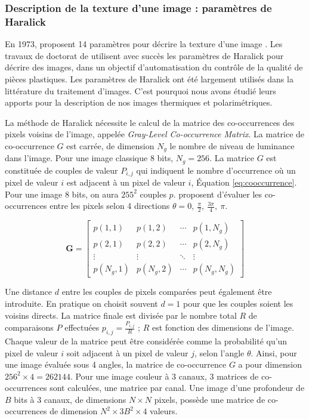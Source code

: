 \subsubsection{Description de la texture d'une image : paramètres de Haralick} \label{subsubsec:haralick}
En 1973, \citeauthor{haralick_textural_1973} proposent 14 paramètres pour décrire la texture d'une image \cite{haralick_textural_1973}.
Les travaux de doctorat de \citeauthor{lacombe_exploitation_2018a} utilisent avec succès les paramètres de Haralick pour décrire des images, dans un objectif  d'automatisation du contrôle de la qualité de pièces plastiques.
Les paramètres de Haralick ont été largement utilisés dans la littérature du traitement d'images.
C'est pourquoi nous avons étudié leurs apports pour la description de nos images thermiques et polarimétriques.

La méthode de Haralick nécessite le calcul de la matrice des co-occurrences des pixels voisins de l'image, appelée \textit{Gray-Level Co-occurrence Matrix}.
La matrice de co-occurrence $G$ est carrée, de dimension $N_g$ le nombre de niveau de luminance dans l'image.
Pour une image classique 8 bits, $N_g = 256$.
La matrice $G$ est constituée de couples de valeur $P_{i, j}$ qui indiquent le nombre d'occurrence où un pixel de valeur $i$ est adjacent à un pixel de valeur $i$, Équation \ref{eq:cooccurrence}.
Pour une image 8 bits, on aura $255^2$ couples $p$.
\citeauthor{haralick_textural_1973} proposent d'évaluer les co-occurrences entre les pixels selon 4 directions $\theta = 0, \ \frac{\pi}{2}, \ \frac{3\pi}{4}, \ \pi$.

\begin{equation} \label{eq:cooccurrence}
\mathbf{G}=\left[\begin{array}{cccc}{p(1,1)} & {p(1,2)} & {\cdots} & {p\left(1, N_{g}\right)} \\ {p(2,1)} & {p(2,2)} & {\cdots} & {p\left(2, N_{g}\right)} \\ {\vdots} & {\vdots} & {\ddots} & {\vdots} \\ {p\left(N_{g}, 1\right)} & {p\left(N_{g}, 2\right)} & {\cdots} & {p\left(N_{g}, N_{g}\right)}\end{array}\right]
\end{equation}

Une distance $d$ entre les couples de pixels comparées peut également être introduite.
En pratique on choisit souvent $d=1$ pour que les couples soient les voisins directs.
La matrice finale est divisée par le nombre total $R$ de comparaisons $P$ effectuées $p_{i, j} = \frac{P_{i, j}}{R}$ ; $R$ est fonction des dimensions de l'image.
Chaque valeur de la matrice peut être considérée comme la probabilité qu'un pixel de valeur $i$ soit adjacent à un pixel de valeur $j$, selon l'angle $\theta$.
Ainsi, pour une image évaluée sous 4 angles, la matrice de co-occurrence $G$ a pour dimension $256^2 \times 4 = 262 144$.
Pour une image couleur à 3 canaux, 3 matrices de co-occurrences sont calculées, une matrice par canal.
Une image d'une profondeur de $B$ bits à 3 canaux, de dimensions $N \times N$ pixels, possède une matrice de co-occurrences de dimension $N^2 \times 3 B^2 \times 4$ valeurs.


